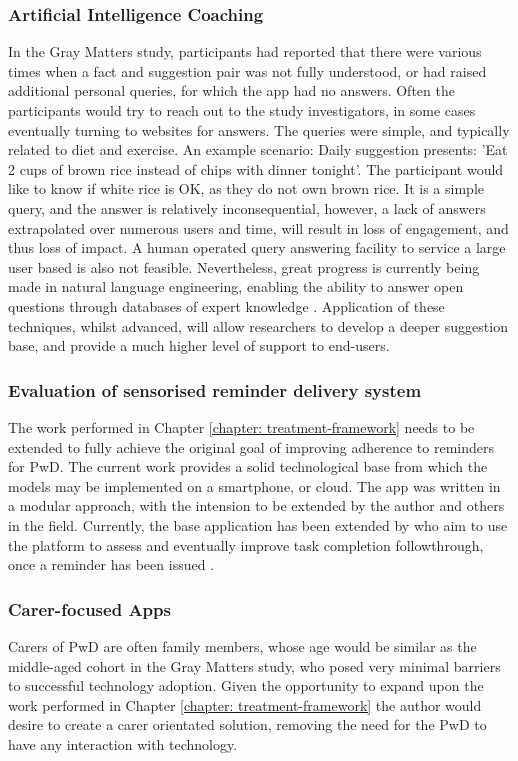 \subsubsection{Artificial Intelligence Coaching}
In the Gray Matters study, participants had reported that there were various times when a fact and suggestion pair was not fully understood, or had raised additional personal queries, for which the app had no answers. Often the participants would try to reach out to the study investigators, in some cases eventually turning to websites for answers. The queries were simple, and typically related to diet and exercise. An example scenario:
Daily suggestion presents: 'Eat 2 cups of brown rice instead of chips with dinner tonight'. The participant would like to know if white rice is OK, as they do not own brown rice. 
It is a simple query, and the answer is relatively inconsequential, however, a lack of answers extrapolated over numerous users and time, will result in loss of engagement, and thus loss of impact. A human operated query answering facility to service a large user based is also not feasible. Nevertheless, great progress is currently being made in natural language engineering, enabling the ability to answer open questions through databases of expert knowledge \cite{HIRSCHMAN2001, Fader2014}. Application of these techniques, whilst advanced, will allow researchers to develop a deeper suggestion base, and provide a much higher level of support to end-users.
 
\subsubsection{Evaluation of sensorised reminder delivery system}
The work performed in Chapter \ref{chapter: treatment-framework} needs to be extended to fully achieve the original goal of improving adherence to reminders for PwD. The current work provides a solid technological base from which the models may be implemented on a smartphone, or cloud. The app was written in a modular approach, with the intension to be extended by the author and others in the field. Currently, the base application has been extended by \citeauthor{Patterson2015} who aim to use the platform to assess and eventually improve task completion followthrough, once a reminder has been issued \cite{Patterson2015}.

\subsubsection{Carer-focused Apps}
Carers of PwD are often family members, whose age would be similar as the middle-aged cohort in the Gray Matters study, who posed very minimal barriers to successful technology adoption. Given the opportunity to expand upon the work performed in Chapter \ref{chapter: treatment-framework} the author would desire to create a carer orientated solution, removing the need for the PwD to have any interaction with technology.

